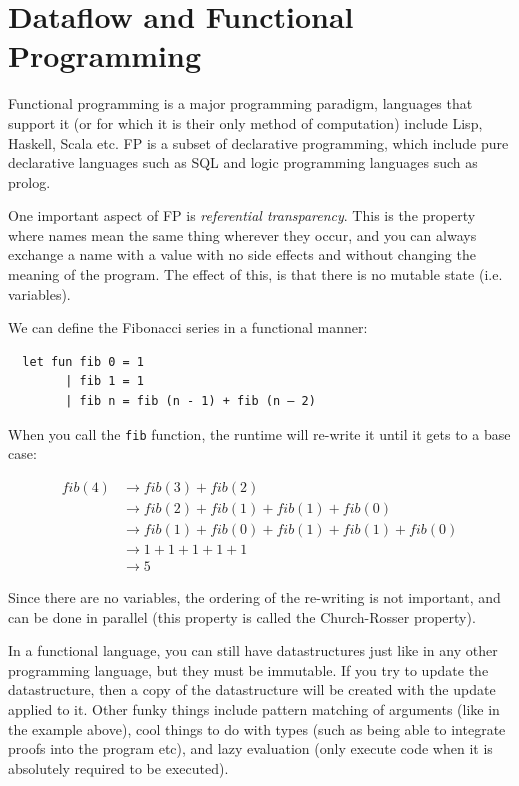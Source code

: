 \section{Dataflow and Functional Programming}

Functional programming is a major programming paradigm, languages that
support it (or for which it is their only method of computation)
include Lisp, Haskell, Scala etc. FP is a subset of declarative
programming, which include pure declarative languages such as SQL and
logic programming languages such as prolog.

One important aspect of FP is \textit{referential transparency}. This
is the property where names mean the same thing wherever they occur,
and you can always exchange a name with a value with no side effects
and without changing the meaning of the program. The effect of this,
is that there is no mutable state (i.e. variables).

We can define the Fibonacci series in a functional manner:

\begin{verbatim}
  let fun fib 0 = 1
        | fib 1 = 1
        | fib n = fib (n - 1) + fib (n – 2)
\end{verbatim}

When you call the \texttt{fib} function, the runtime will re-write it
until it gets to a base case:

\[
\begin{split}
  fib(4) &\rightarrow fib(3) + fib(2)\\
         &\rightarrow fib(2) + fib(1) + fib(1) + fib(0)\\
         &\rightarrow fib(1) + fib(0) + fib(1) + fib(1) + fib(0)\\
         &\rightarrow 1 + 1 + 1 + 1 + 1\\
         &\rightarrow 5
\end{split}
\]

Since there are no variables, the ordering of the re-writing is not
important, and can be done in parallel (this property is called the
Church-Rosser property).

In a functional language, you can still have datastructures just like
in any other programming language, but they must be immutable. If you
try to update the datastructure, then a copy of the datastructure will
be created with the update applied to it. Other funky things include
pattern matching of arguments (like in the example above), cool things
to do with types (such as being able to integrate proofs into the
program etc), and lazy evaluation (only execute code when it is
absolutely required to be executed).

